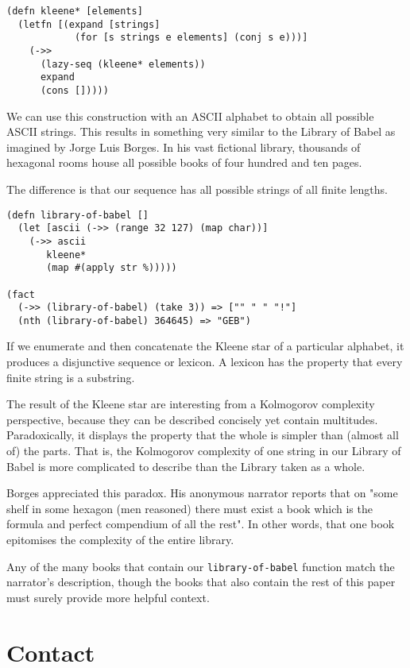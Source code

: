 \documentclass[numbers, preprint]{sigplanconf}
\begin{document}
\begin{verbatim}
(defn kleene* [elements]
  (letfn [(expand [strings]
            (for [s strings e elements] (conj s e)))]
    (->>
      (lazy-seq (kleene* elements))
      expand
      (cons []))))
\end{verbatim}

We can use this construction with an ASCII alphabet to obtain all possible ASCII strings.
This results in something very similar to the Library of Babel as imagined by Jorge Luis Borges\cite{The Library of Babel}. In his
vast fictional library, thousands of hexagonal rooms house all possible books of four hundred and ten pages.

The difference is that our sequence has all possible strings of all finite lengths.

\begin{verbatim}
(defn library-of-babel []
  (let [ascii (->> (range 32 127) (map char))]
    (->> ascii
       kleene*
       (map #(apply str %)))))

(fact
  (->> (library-of-babel) (take 3)) => ["" " " "!"]
  (nth (library-of-babel) 364645) => "GEB")
\end{verbatim}

If we enumerate and then concatenate the Kleene star of a particular alphabet, it produces
a disjunctive sequence or lexicon. A lexicon has the property that every finite string is a substring.

The result of the Kleene star are interesting from a Kolmogorov complexity perspective, because they can be described
concisely yet contain multitudes. Paradoxically, it displays the property that the whole is simpler than (almost all of)
the parts. That is, the Kolmogorov complexity of one string in our Library of Babel is more complicated to describe
than the Library taken as a whole.

Borges appreciated this paradox. His anonymous narrator reports that on "some shelf in some hexagon (men reasoned)
there must exist a book which is the formula and perfect compendium of all the rest". In other words, that one book
epitomises the complexity of the entire library.

Any of the many books that contain our \verb|library-of-babel| function match the narrator's description,
though the books that also contain the rest of this paper must surely provide more helpful context.

\section{Contact}
\end{document}
